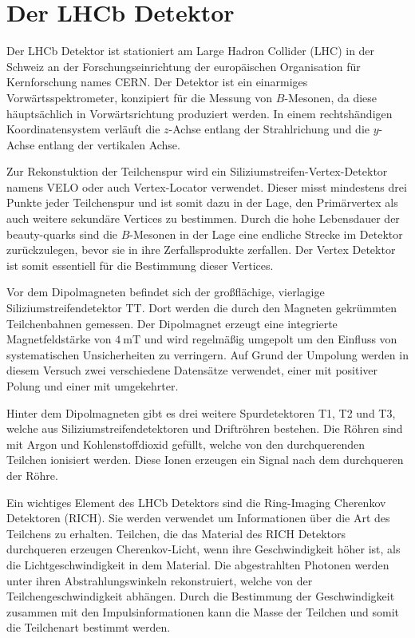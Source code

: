 \section{Der LHCb Detektor}
\label{sec:lhcb}

Der LHCb Detektor \cite{lhcb} ist stationiert am Large Hadron Collider (LHC) in
der Schweiz an der Forschungseinrichtung der europäischen
Organisation für Kernforschung names CERN. Der Detektor ist ein einarmiges
Vorwärtsspektrometer, konzipiert für die Messung von $B$-Mesonen, da diese
häuptsächlich in Vorwärtsrichtung produziert werden. In einem rechtshändigen
Koordinatensystem verläuft die $z$-Achse entlang der Strahlrichung und die
$y$-Achse entlang der vertikalen Achse. \par

Zur Rekonstuktion der Teilchenspur wird ein Siliziumstreifen-Vertex-Detektor
namens VELO oder auch Vertex-Locator verwendet. Dieser misst mindestens drei
Punkte jeder Teilchenspur und ist somit dazu in der Lage, den Primärvertex als
auch weitere sekundäre Vertices zu bestimmen. Durch die hohe Lebensdauer der beauty-quarks
sind die $B$-Mesonen in der Lage eine endliche Strecke im Detektor zurückzulegen,
bevor sie in ihre Zerfallsprodukte zerfallen. Der Vertex Detektor ist somit
essentiell für die Bestimmung dieser Vertices. \par
Vor dem Dipolmagneten befindet sich
der großflächige, vierlagige Siliziumstreifendetektor TT. Dort werden die durch den
Magneten gekrümmten Teilchenbahnen gemessen. Der Dipolmagnet erzeugt eine
integrierte Magnetfeldstärke von $\SI{4}{\milli\tesla}$ und wird regelmäßig
umgepolt um den Einfluss von systematischen Unsicherheiten zu verringern. Auf Grund
der Umpolung werden in diesem Versuch zwei verschiedene Datensätze verwendet, einer
mit positiver Polung und einer mit umgekehrter. \par
Hinter dem Dipolmagneten gibt es drei weitere Spurdetektoren T1, T2 und T3, welche
aus Siliziumstreifendetektoren und Driftröhren bestehen. Die Röhren sind mit
Argon und Kohlenstoffdioxid gefüllt, welche von den durchquerenden Teilchen
ionisiert werden. Diese Ionen erzeugen ein Signal nach dem durchqueren der Röhre. \par

Ein wichtiges Element des LHCb Detektors sind die Ring-Imaging Cherenkov Detektoren (RICH).
Sie werden verwendet um Informationen über die Art des Teilchens zu erhalten. Teilchen,
die das Material des RICH Detektors durchqueren erzeugen Cherenkov-Licht, wenn
ihre Geschwindigkeit höher ist, als die Lichtgeschwindigkeit in dem Material. Die
abgestrahlten Photonen werden unter ihren Abstrahlungswinkeln rekonstruiert, welche
von der Teilchengeschwindigkeit abhängen. Durch die Bestimmung der Geschwindigkeit
zusammen mit den Impulsinformationen kann die Masse der Teilchen und somit die
Teilchenart bestimmt werden.\par

